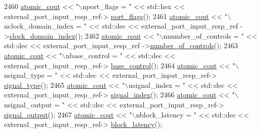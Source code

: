 \begin{DoxyCode}
2460             \hyperlink{cmd__line_8h_a0bc38ccc65c79ba06c6fcd7b4bf554c3}{atomic\_cout} << \textcolor{stringliteral}{"\(\backslash\)nport\_flags = "} << std::hex << external\_port\_input\_resp\_ref->
      \hyperlink{classavdecc__lib_1_1external__port__input__descriptor__response_a66bad2f1317cba04f0ea271f7181b58f}{port\_flags}();
2461             \hyperlink{cmd__line_8h_a0bc38ccc65c79ba06c6fcd7b4bf554c3}{atomic\_cout} << \textcolor{stringliteral}{"\(\backslash\)nclock\_domain\_index = "} << std::dec << external\_port\_input\_resp\_ref
      ->\hyperlink{classavdecc__lib_1_1external__port__input__descriptor__response_aab7f93d403d8b73f8f4a8fb7c61ecded}{clock\_domain\_index}();
2462             \hyperlink{cmd__line_8h_a0bc38ccc65c79ba06c6fcd7b4bf554c3}{atomic\_cout} << \textcolor{stringliteral}{"\(\backslash\)nnumber\_of\_controls = "} << std::dec << external\_port\_input\_resp\_ref
      ->\hyperlink{classavdecc__lib_1_1external__port__input__descriptor__response_a5accf7abc7d231a0767ad5cac68b8b39}{number\_of\_controls}();
2463             \hyperlink{cmd__line_8h_a0bc38ccc65c79ba06c6fcd7b4bf554c3}{atomic\_cout} << \textcolor{stringliteral}{"\(\backslash\)nbase\_control = "} << std::dec << external\_port\_input\_resp\_ref->
      \hyperlink{classavdecc__lib_1_1external__port__input__descriptor__response_ac1f5297533142234c764e84c01ce5a16}{base\_control}();
2464             \hyperlink{cmd__line_8h_a0bc38ccc65c79ba06c6fcd7b4bf554c3}{atomic\_cout} << \textcolor{stringliteral}{"\(\backslash\)nsignal\_type = "} << std::dec << external\_port\_input\_resp\_ref->
      \hyperlink{classavdecc__lib_1_1external__port__input__descriptor__response_ac204637e5ecfc30b4cc47c0d78d81ce1}{signal\_type}();
2465             \hyperlink{cmd__line_8h_a0bc38ccc65c79ba06c6fcd7b4bf554c3}{atomic\_cout} << \textcolor{stringliteral}{"\(\backslash\)nsignal\_index = "} << std::dec << external\_port\_input\_resp\_ref->
      \hyperlink{classavdecc__lib_1_1external__port__input__descriptor__response_aa1d83268f9a492f864d3e213acf71a97}{signal\_index}();
2466             \hyperlink{cmd__line_8h_a0bc38ccc65c79ba06c6fcd7b4bf554c3}{atomic\_cout} << \textcolor{stringliteral}{"\(\backslash\)nsignal\_output = "} << std::dec << external\_port\_input\_resp\_ref->
      \hyperlink{classavdecc__lib_1_1external__port__input__descriptor__response_a729bc59f434e7de353db02db35977dfa}{signal\_output}();
2467             \hyperlink{cmd__line_8h_a0bc38ccc65c79ba06c6fcd7b4bf554c3}{atomic\_cout} << \textcolor{stringliteral}{"\(\backslash\)nblock\_latency = "} << std::dec << external\_port\_input\_resp\_ref->
      \hyperlink{classavdecc__lib_1_1external__port__input__descriptor__response_af1eddc3de0237a6db00b74603eba47c6}{block\_latency}();

\end{DoxyCode}
